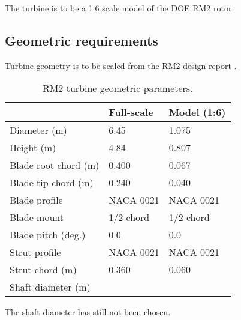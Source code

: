 \documentclass[10pt,a4paper]{article}
\begin{document}
The turbine is to be a 1:6 scale model of the DOE RM2 rotor.

\subsection{Geometric requirements}

Turbine geometry is to be scaled from the RM2 design report \cite{Barone2011}.

\begin{table}[ht]
\centering
\begin{tabular}{l|l|l}
   & Full-scale & Model (1:6) \\
\hline 
Diameter (m)   & 6.45 & 1.075 \\ 
Height (m)     & 4.84 & 0.807 \\ 
Blade root chord (m) & 0.400 & 0.067 \\ 
Blade tip chord (m)  & 0.240 & 0.040 \\ 
Blade profile & NACA 0021 & NACA 0021 \\ 
Blade mount & 1/2 chord & 1/2 chord \\ 
Blade pitch (deg.) & 0.0 & 0.0 \\ 
Strut profile & NACA 0021 & NACA 0021 \\ 
Strut chord (m) & 0.360 & 0.060 \\ 
Shaft diameter (m) &  &  \\ 
\end{tabular}
\caption{RM2 turbine geometric parameters.}
\end{table}

The shaft diameter has still not been chosen.



\end{document}
